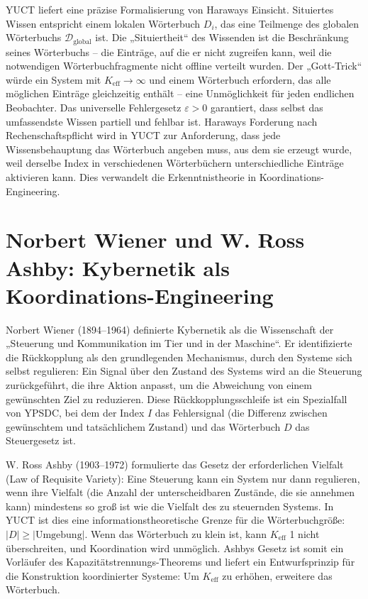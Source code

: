 \documentclass[12pt,a4paper]{article}
\begin{document}
	YUCT liefert eine präzise Formalisierung von Haraways Einsicht. Situiertes Wissen entspricht einem lokalen Wörterbuch \(D_i\), das eine Teilmenge des globalen Wörterbuchs \(\mathcal{D}_{\text{global}}\) ist. Die „Situiertheit“ des Wissenden ist die Beschränkung seines Wörterbuchs – die Einträge, auf die er nicht zugreifen kann, weil die notwendigen Wörterbuchfragmente nicht offline verteilt wurden. Der „Gott-Trick“ würde ein System mit \(K_{\mathrm{eff}} \to \infty\) und einem Wörterbuch erfordern, das alle möglichen Einträge gleichzeitig enthält – eine Unmöglichkeit für jeden endlichen Beobachter. Das universelle Fehlergesetz \(\varepsilon > 0\) garantiert, dass selbst das umfassendste Wissen partiell und fehlbar ist. Haraways Forderung nach Rechenschaftspflicht wird in YUCT zur Anforderung, dass jede Wissensbehauptung das Wörterbuch angeben muss, aus dem sie erzeugt wurde, weil derselbe Index in verschiedenen Wörterbüchern unterschiedliche Einträge aktivieren kann. Dies verwandelt die Erkenntnistheorie in Koordinations-Engineering.
	
	\section{Norbert Wiener und W. Ross Ashby: Kybernetik als Koordinations-Engineering}
	
	Norbert Wiener (1894–1964) definierte Kybernetik als die Wissenschaft der „Steuerung und Kommunikation im Tier und in der Maschine“. Er identifizierte die Rückkopplung als den grundlegenden Mechanismus, durch den Systeme sich selbst regulieren: Ein Signal über den Zustand des Systems wird an die Steuerung zurückgeführt, die ihre Aktion anpasst, um die Abweichung von einem gewünschten Ziel zu reduzieren. Diese Rückkopplungsschleife ist ein Spezialfall von YPSDC, bei dem der Index \(I\) das Fehlersignal (die Differenz zwischen gewünschtem und tatsächlichem Zustand) und das Wörterbuch \(D\) das Steuergesetz ist.
	
	W. Ross Ashby (1903–1972) formulierte das Gesetz der erforderlichen Vielfalt (Law of Requisite Variety): Eine Steuerung kann ein System nur dann regulieren, wenn ihre Vielfalt (die Anzahl der unterscheidbaren Zustände, die sie annehmen kann) mindestens so groß ist wie die Vielfalt des zu steuernden Systems. In YUCT ist dies eine informationstheoretische Grenze für die Wörterbuchgröße: \(|D| \ge |\text{Umgebung}|\). Wenn das Wörterbuch zu klein ist, kann \(K_{\mathrm{eff}}\) 1 nicht überschreiten, und Koordination wird unmöglich. Ashbys Gesetz ist somit ein Vorläufer des Kapazitätstrennungs-Theorems und liefert ein Entwurfsprinzip für die Konstruktion koordinierter Systeme: Um \(K_{\mathrm{eff}}\) zu erhöhen, erweitere das Wörterbuch.
	
\end{document}
